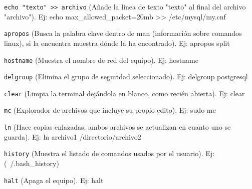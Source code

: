 \documentclass[12pt]{article}
\begin{document}
\begin{description}
\item {\tt echo "texto" >> archivo} (Añade la línea de texto "texto" al final del archivo "archivo"). Ej: echo max_allowed_packet=20mb >> /etc/mysql/my.cnf
\item {\tt apropos} (Busca la palabra clave dentro de man (información sobre comandos linux), si la encuentra muestra dónde la ha encontrado). Ej: apropos split
\item {\tt hostname} (Muestra el nombre de red del equipo). Ej: hostname
\item {\tt delgroup} (Elimina el grupo de seguridad seleccionado). Ej: delgroup postgresql
\item {\tt clear} (Limpia la terminal dejándola en blanco, como recién abierta). Ej: clear
\item {\tt mc} (Explorador de archivos que incluye su propio edito). Ej: sudo mc
\item {\tt ln} (Hace copias enlazadas; ambos archivos se actualizan en cuanto uno se guarda). Ej: ln archivo1 /directorio/archivo2
\item {\tt history} (Muestra el listado de comandos usados por el usuario). Ej: (~/.bash_history)
\item {\tt halt} (Apaga el equipo). Ej: halt  
\end{description}
\end{document}
